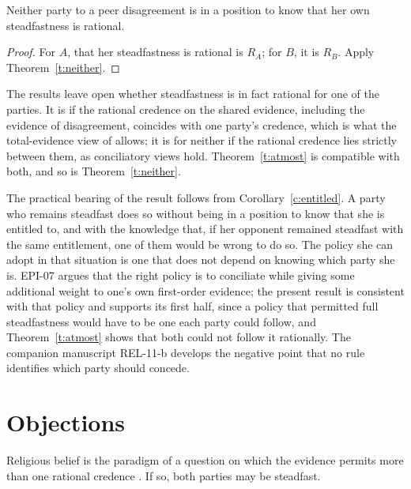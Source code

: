\documentclass{situationist-preprint}
\begin{document}
\begin{corollary}\label{c:entitled}
Neither party to a peer disagreement is in a position to know that her own steadfastness is rational.
\end{corollary}

\begin{proof}
For $A$, that her steadfastness is rational is $R_A$; for $B$, it is $R_B$. Apply Theorem~\ref{t:neither}.
\end{proof}

\begin{remark}\label{r:open}
The results leave open whether steadfastness is in fact rational for one of the parties. It is if the rational credence on the shared evidence, including the evidence of disagreement, coincides with one party's credence, which is what the total-evidence view of \citet{Kelly2005} allows; it is for neither if the rational credence lies strictly between them, as conciliatory views hold. Theorem~\ref{t:atmost} is compatible with both, and so is Theorem~\ref{t:neither}.
\end{remark}

The practical bearing of the result follows from Corollary~\ref{c:entitled}. A party who remains steadfast does so without being in a position to know that she is entitled to, and with the knowledge that, if her opponent remained steadfast with the same entitlement, one of them would be wrong to do so. The policy she can adopt in that situation is one that does not depend on knowing which party she is. EPI-07 argues that the right policy is to conciliate while giving some additional weight to one's own first-order evidence; the present result is consistent with that policy and supports its first half, since a policy that permitted full steadfastness would have to be one each party could follow, and Theorem~\ref{t:atmost} shows that both could not follow it rationally. The companion manuscript REL-11-b develops the negative point that no rule identifies which party should concede.

\section{Objections}\label{s:obj}

\begin{objection}[Permissivism]
Religious belief is the paradigm of a question on which the evidence permits more than one rational credence \citep{Rosen2001}. If so, both parties may be steadfast.
\end{objection}
\end{document}
